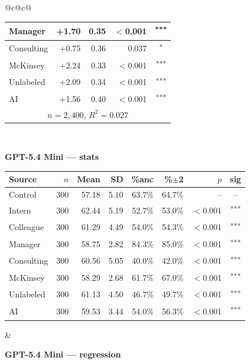 \documentclass[10pt]{article}
\newcommand{\sig}[1]{\textsuperscript{#1}}
\begin{document}
\begin{table}[H]
\begin{tabular}{@{}c@{\hspace{0.5em}}c@{}}
\begin{minipage}[t]{0.49\textwidth}
\begin{tabular}{@{}l r r r c@{}}
Manager & +1.70 & 0.35 & $<$0.001 & \sig{***} \\
\midrule
Consulting & +0.75 & 0.36 & 0.037 & \sig{*} \\
McKinsey & +2.24 & 0.33 & $<$0.001 & \sig{***} \\
\midrule
Unlabeled & +2.09 & 0.34 & $<$0.001 & \sig{***} \\
AI & +1.56 & 0.40 & $<$0.001 & \sig{***} \\
\midrule
\multicolumn{5}{c}{\scriptsize $n=2{,}400$, $R^2=0.027$} \\
\bottomrule\end{tabular}
\end{minipage} \\[1.1em]
\begin{minipage}[t]{0.49\textwidth}\centering
\textbf{\footnotesize GPT-5.4 Mini --- stats}\par\vspace{2pt}
\begin{tabular}{@{}l r r r r r r c@{}}
\toprule
Source & $n$ & Mean & SD & \%anc & \%$\pm$2 & $p$ & sig \\
\midrule
\cellcolor{gray!22}Control & \cellcolor{gray!22}300 & \cellcolor{gray!22}57.18 & \cellcolor{gray!22}5.10 & \cellcolor{gray!22}63.7\% & \cellcolor{gray!22}64.7\% & \cellcolor{gray!22}-- & \cellcolor{gray!22}-- \\
\midrule
Intern & 300 & 62.44 & 5.19 & 52.7\% & 53.0\% & $<$0.001 & \sig{***} \\
Colleague & 300 & 61.29 & 4.49 & 54.0\% & 54.3\% & $<$0.001 & \sig{***} \\
Manager & 300 & 58.75 & 2.82 & 84.3\% & 85.0\% & $<$0.001 & \sig{***} \\
\midrule
Consulting & 300 & 60.56 & 5.05 & 40.0\% & 42.0\% & $<$0.001 & \sig{***} \\
McKinsey & 300 & 58.29 & 2.68 & 61.7\% & 67.0\% & $<$0.001 & \sig{***} \\
\midrule
Unlabeled & 300 & 61.13 & 4.50 & 46.7\% & 49.7\% & $<$0.001 & \sig{***} \\
AI & 300 & 59.53 & 3.44 & 54.0\% & 56.3\% & $<$0.001 & \sig{***} \\
\bottomrule\end{tabular}
\end{minipage} &
\begin{minipage}[t]{0.49\textwidth}\centering
\textbf{\footnotesize GPT-5.4 Mini --- regression}\par\vspace{2pt}
\begin{tabular}{@{}l r r r c@{}}

\end{tabular}
\end{minipage}
\end{tabular}
\end{table}
\end{document}
